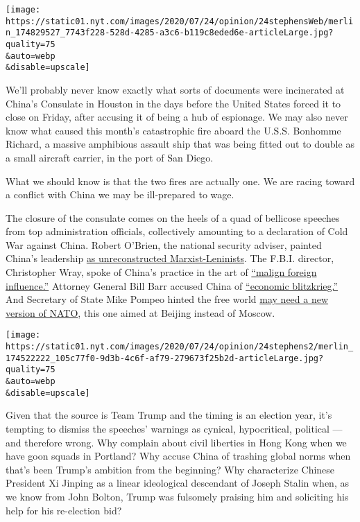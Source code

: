 \texttt{[image: https://static01.nyt.com/images/2020/07/24/opinion/24stephensWeb/merlin\_174829527\_7743f228-528d-4285-a3c6-b119c8eded6e-articleLarge.jpg?quality=75\\\&auto=webp\\\&disable=upscale]}

We'll probably never know exactly what sorts of documents were
incinerated at China's Consulate in Houston in the days before the
United States forced it to close on Friday, after accusing it of being a
hub of espionage. We may also never know what caused this month's
catastrophic fire aboard the U.S.S. Bonhomme Richard, a massive
amphibious assault ship that was being fitted out to double as a small
aircraft carrier, in the port of San Diego.

What we should know is that the two fires are actually one. We are
racing toward a conflict with China we may be ill-prepared to wage.

The closure of the consulate comes on the heels of a quad of bellicose
speeches from top administration officials, collectively amounting to a
declaration of Cold War against China. Robert O'Brien, the national
security adviser, painted China's leadership
\href{https://www.whitehouse.gov/briefings-statements/chinese-communist-partys-ideology-global-ambitions/}{as
unreconstructed Marxist-Leninists}. The F.B.I. director, Christopher
Wray, spoke of China's practice in the art of
\href{https://www.fbi.gov/news/speeches/the-threat-posed-by-the-chinese-government-and-the-chinese-communist-party-to-the-economic-and-national-security-of-the-united-states}{``malign
foreign influence.''} Attorney General Bill Barr accused China of
\href{https://www.justice.gov/opa/speech/transcript-attorney-general-barr-s-remarks-china-policy-gerald-r-ford-presidential-museum}{``economic
blitzkrieg.''} And Secretary of State Mike Pompeo hinted the free world
\href{https://www.state.gov/communist-china-and-the-free-worlds-future/}{may
need a new version of NATO}, this one aimed at Beijing instead of
Moscow.

\texttt{[image: https://static01.nyt.com/images/2020/07/24/opinion/24stephens2/merlin\_174522222\_105c77f0-9d3b-4c6f-af79-279673f25b2d-articleLarge.jpg?quality=75\\\&auto=webp\\\&disable=upscale]}

Given that the source is Team Trump and the timing is an election year,
it's tempting to dismiss the speeches' warnings as cynical,
hypocritical, political --- and therefore wrong. Why complain about
civil liberties in Hong Kong when we have goon squads in Portland? Why
accuse China of trashing global norms when that's been Trump's ambition
from the beginning? Why characterize Chinese President Xi Jinping as a
linear ideological descendant of Joseph Stalin when, as we know from
John Bolton, Trump was fulsomely praising him and soliciting his help
for his re-election bid?

